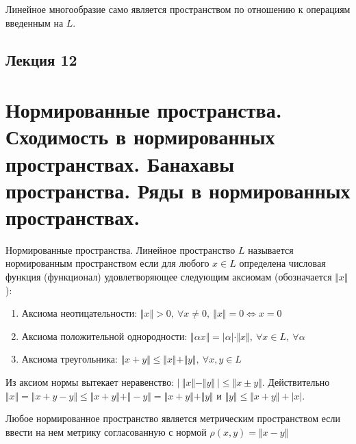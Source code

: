 \documentclass[12pt]{report}
\newcommand{\be}{\begin{enumerate}}
\newcommand{\ee}{\end{enumerate}}
\renewcommand{\[}{$\\\displaystyle}
\renewcommand{\]}{\\$}
\renewcommand{\[}{$\\\displaystyle}
\newcommand{\sep}{,\ }
\begin{document}
Линейное многообразие само является пространством по отношению к операциям введенным на $L$.

\subsection {Лекция 12}

\section{Нормированные пространства. Сходимость в нормированных пространствах. Банахавы пространства. Ряды в нормированных пространствах.}

Нормированные пространства. Линейное пространство $L$ называется нормированным пространством если для любого $x\in L$ определена числовая функция (функционал) удовлетворяющее следующим аксиомам (обозначается $ \Vert x \Vert $):

\be
  \item Аксиома неотицательности: $ \Vert x \Vert > 0 \sep \forall x \neq 0 \sep  \Vert x \Vert  = 0 \Leftrightarrow x = 0 $
  \item Аксиома положительной однородности: $ \Vert \alpha x \Vert = |\alpha| \cdot  \Vert x \Vert \sep \forall x \in L \sep \forall \alpha $
  \item Аксиома треугольника: $ \Vert x+y \Vert \leq  \Vert x \Vert + \Vert y \Vert  \sep \forall x,y \in L$
\ee

Из аксиом нормы вытекает неравенство: $| \ \Vert x \Vert  -  \Vert y \Vert \ | \leq \Vert x \pm y \Vert $.
Действительно $ \Vert x \Vert = \Vert x + y - y \Vert \leq \Vert x + y \Vert + \Vert - y \Vert = \Vert x + y \Vert + \Vert y \Vert $ и $ \Vert y \Vert \leq \Vert x + y \Vert + |x|$.

Любое нормированное пространство является метрическим пространством если ввести на нем метрику согласованную с нормой $ \rho(x,y) = \Vert x - y \Vert$
\end{document}
